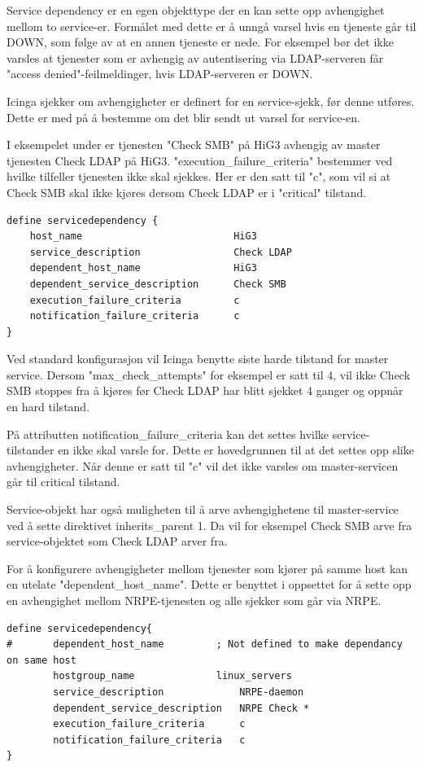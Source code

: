 Service dependency er en egen objekttype der en kan sette opp avhengighet mellom to service-er. Formålet med dette er å unngå varsel hvis en tjeneste går til DOWN, som følge av at en annen tjeneste er nede. For eksempel bør det ikke varsles at tjenester som er avhengig av autentisering via LDAP-serveren får "access denied"-feilmeldinger, hvis LDAP-serveren er DOWN. 

Icinga sjekker om avhengigheter er definert for en service-sjekk, før denne utføres. Dette er med på å bestemme om det blir sendt ut varsel for service-en.

I eksempelet under er tjenesten "Check SMB" på HiG3 avhengig av master tjenesten Check LDAP på HiG3. "execution\_failure\_criteria" bestemmer ved hvilke tilfeller tjenesten ikke skal sjekkes. Her er den satt til "c", som vil si at Check SMB skal ikke kjøres dersom Check LDAP er i "critical" tilstand.

\begin{lstlisting}[style=example]
define servicedependency {
	host_name                          HiG3
	service_description                Check LDAP
	dependent_host_name                HiG3
	dependent_service_description      Check SMB
	execution_failure_criteria         c
	notification_failure_criteria      c
}
\end{lstlisting}

Ved standard konfigurasjon vil Icinga benytte siste harde tilstand for master service. Dersom "max\_check\_attempts" for eksempel er satt til 4, vil ikke Check SMB stoppes fra å kjøres før Check LDAP har blitt sjekket 4 ganger og oppnår en hard tilstand. 

På attributten notification\_failure\_criteria kan det settes hvilke service-tilstander en ikke skal varsle for. Dette er hovedgrunnen til at det settes opp slike avhengigheter. Når denne er satt til "c" vil det ikke varsles om master-servicen går til critical tilstand.

Service-objekt har også muligheten til å arve avhengighetene til master-service ved å sette direktivet inherits\_parent 1. Da vil for eksempel Check SMB arve fra service-objektet som Check LDAP arver fra.

For å konfigurere avhengigheter mellom tjenester som kjører på samme host kan en utelate "dependent\_host\_name". Dette er benyttet i oppsettet for å sette opp en avhengighet mellom NRPE-tjenesten og alle sjekker som går via NRPE.

\begin{lstlisting}[style=example]
define servicedependency{
#       dependent_host_name   		; Not defined to make dependancy on same host            
        hostgroup_name           	linux_servers
        service_description         	NRPE-daemon
        dependent_service_description   NRPE Check *
        execution_failure_criteria      c
        notification_failure_criteria   c
}
\end{lstlisting}


